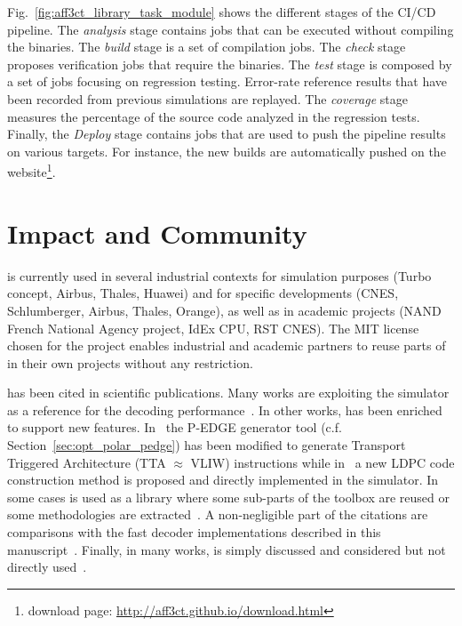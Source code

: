 Fig.~\ref{fig:aff3ct_library_task_module} shows the different stages of the
\AFFECT CI/CD pipeline. The \emph{analysis} stage contains jobs that can be
executed without compiling the \AFFECT binaries. The \emph{build} stage is a set
of compilation jobs. The \emph{check} stage proposes verification jobs that
require the \AFFECT binaries. The \emph{test} stage is composed by a set of jobs
focusing on regression testing. Error-rate reference results that have been
recorded from previous simulations are replayed. The \emph{coverage} stage
measures the percentage of the \AFFECT source code analyzed in the regression
tests. Finally, the \emph{Deploy} stage contains jobs that are used to push the
pipeline results on various targets. For instance, the new builds are
automatically pushed on the \AFFECT website\footnote{\AFFECT download page:
\url{http://aff3ct.github.io/download.html}}.

\section{Impact and Community}
\label{sec:aff3ct_impact}

\AFFECT is currently used in several industrial contexts for simulation purposes
(Turbo concept, Airbus, Thales, Huawei) and for specific developments (CNES,
Schlumberger, Airbus, Thales, Orange), as well as in academic projects (NAND
French National Agency project, IdEx CPU, RST CNES). The MIT license chosen for
the project enables industrial and academic partners to reuse parts of \AFFECT
in their own projects without any restriction.

\AFFECT has been cited in scientific publications. Many works are exploiting the
\AFFECT simulator as a reference for the decoding performance~\cite{Pignoly2018,
Poulenard2018,Ghanaatian2018,Wang2019,Hsieh2020,Rush2020,Duffy2020}. In other
works, \AFFECT has been enriched to support new features.
In~\cite{Leonardon2018b} the P-EDGE generator tool (c.f.
Section~\ref{sec:opt_polar_pedge}) has been modified to generate Transport
Triggered Architecture (TTA $\approx$ VLIW) instructions while
in~\cite{Tasdighi2020} a new LDPC code construction method is proposed and
directly implemented in the \AFFECT simulator. In some cases \AFFECT is used as
a library where some sub-parts of the toolbox are reused or some methodologies
are extracted~\cite{Florian2018,Cavatassi2019a,Cavatassi2019b,Ercan2020}. A
non-negligible part of the citations are comparisons with the fast decoder
implementations described in this manuscript~\cite{Zeng2017,Leonardon2018a,
Guermouche2019,LeGal2019a,Shen2020}. Finally, in many works, \AFFECT is simply
discussed and considered but not directly used~\cite{Debbabi2016,Debbabi2016a,
Ercan2017,Natarajan2018,Cenova2019,Krainyk2019,Vameghestahbanati2019,
Mohammed2019,Shaheen2019,Aly2019,Delomier2020}.

